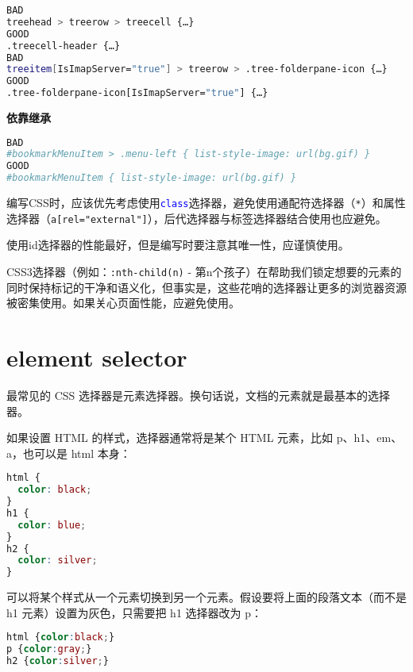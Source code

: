 \begin{lstlisting}[language=bash]
BAD
treehead > treerow > treecell {…}
GOOD
.treecell-header {…}
BAD
treeitem[IsImapServer="true"] > treerow > .tree-folderpane-icon {…}
GOOD
.tree-folderpane-icon[IsImapServer="true"] {…}
\end{lstlisting}

\begin{compactenum}[5.]
\item \textbf{依靠继承}
\end{compactenum}

\begin{lstlisting}[language=bash]
BAD
#bookmarkMenuItem > .menu-left { list-style-image: url(bg.gif) }
GOOD
#bookmarkMenuItem { list-style-image: url(bg.gif) }
\end{lstlisting}


编写CSS时，应该优先考虑使用\texttt{\textcolor{Blue}{class}}选择器，避免使用通配符选择器（\texttt{*}）和属性选择器（\texttt{a[rel="external"]}），后代选择器与标签选择器结合使用也应避免。

使用id选择器的性能最好，但是编写时要注意其唯一性，应谨慎使用。

CSS3选择器（例如：\texttt{:nth-child(n)} - 第n个孩子）在帮助我们锁定想要的元素的同时保持标记的干净和语义化，但事实是，这些花哨的选择器让更多的浏览器资源被密集使用。如果关心页面性能，应避免使用。



\section{element selector}


最常见的 CSS 选择器是元素选择器。换句话说，文档的元素就是最基本的选择器。

如果设置 HTML 的样式，选择器通常将是某个 HTML 元素，比如 p、h1、em、a，也可以是 html 本身：

\begin{lstlisting}[language=CSS]
html {
  color: black;
}
h1 {
  color: blue;
}
h2 {
  color: silver;
}
\end{lstlisting}


可以将某个样式从一个元素切换到另一个元素。假设要将上面的段落文本（而不是 h1 元素）设置为灰色，只需要把 h1 选择器改为 p：


\begin{lstlisting}[language=CSS]
html {color:black;}
p {color:gray;}
h2 {color:silver;}
\end{lstlisting}


